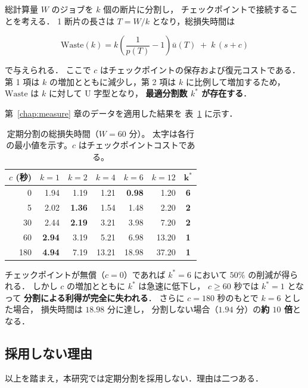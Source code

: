 \documentclass[11pt,a4paper]{ltjsreport}
\newcommand{\Waste}{\mathrm{Waste}}
\begin{document}
総計算量 $W$ のジョブを $k$ 個の断片に分割し，
チェックポイントで接続することを考える．
1 断片の長さは $T = W/k$ となり，総損失時間は

\begin{equation}
\Waste(k)
=
k \left( \frac{1}{p(T)} - 1 \right) \bar u(T)
\;+\;
k\,(s + c)
\label{eq:waste_split}
\end{equation}

で与えられる．
ここで $c$ はチェックポイントの保存および復元コストである．
第 1 項は $k$ の増加とともに減少し，第 2 項は $k$ に比例して増加するため，
$\Waste$ は $k$ に対して U 字型となり，
\textbf{最適分割数 $k^{*}$ が存在する}．

第~\ref{chap:measure} 章のデータを適用した結果を
表~\ref{tab:split_summary} に示す．

\begin{table}[htbp]
\centering
\caption{定期分割の総損失時間（$W = 60$ 分）。
太字は各行の最小値を示す。$c$ はチェックポイントコストである。}
\label{tab:split_summary}
\small
\begin{tabular}{@{}rrrrrrc@{}}
\toprule
$c$ (秒) & $k{=}1$ & $k{=}2$ & $k{=}4$ & $k{=}6$ & $k{=}12$ & $\mathbf{k^{*}}$ \\
\midrule
0   & 1.94 & 1.19 & 1.21 & \textbf{0.98} & 1.20 & \textbf{6} \\
5   & 2.02 & \textbf{1.36} & 1.54 & 1.48 & 2.20 & \textbf{2} \\
30  & 2.44 & \textbf{2.19} & 3.21 & 3.98 & 7.20 & \textbf{2} \\
60  & \textbf{2.94} & 3.19 & 5.21 & 6.98 & 13.20 & \textbf{1} \\
180 & \textbf{4.94} & 7.19 & 13.21 & 18.98 & 37.20 & \textbf{1} \\
\bottomrule
\end{tabular}
\end{table}

チェックポイントが無償（$c = 0$）であれば
$k^{*} = 6$ において $50\%$ の削減が得られる．
しかし $c$ の増加とともに $k^{*}$ は急速に低下し，
$c \geq 60$ 秒では $k^{*} = 1$ となって
\textbf{分割による利得が完全に失われる}．
さらに $c = 180$ 秒のもとで $k = 6$ とした場合，
損失時間は $18.98$ 分に達し，
分割しない場合（$1.94$ 分）の\textbf{約 $10$ 倍}となる．

\subsection{採用しない理由}
\label{sec:why_not_split}

以上を踏まえ，本研究では定期分割を採用しない．理由は二つある．
\end{document}
